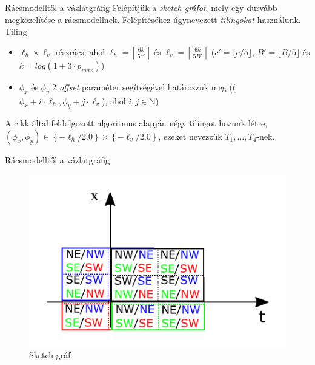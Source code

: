 \documentclass[10pt]{beamer}
\begin{document}
\begin{frame}{Rácsmodelltől a vázlatgráfig}
  Felépítjük a \textit{sketch gráfot}, mely egy durvább megközelítése a rácsmodellnek. Felépítéséhez úgynevezett \textit{tilingokat} használunk.\newline
  Tiling
  \begin{itemize}
  	\item $ \ell_h \times \ell_v $ részrács, ahol $ \ell_h = \left \lceil \frac{6k}{5c'} \right \rceil $ és $ \ell_v = \left \lceil \frac{6k}{5B'} \right \rceil $ ($ c' = \lfloor c/5 \rfloor $, $ B' = \lfloor B/5 \rfloor $ és $ k = log(1 + 3 \cdot p_{max}) $)
  	\item $ \phi_x $ és $ \phi_y $ 2 \textit{offset} paraméter segítségével határozzuk meg (($ \phi_x + i \cdot \ell_h, \phi_y + j \cdot \ell_v $), ahol $ i,j \in \mathbb{N} $)
  \end{itemize}
  A cikk által feldolgozott algoritmus alapján négy tilingot hozunk létre, $ (\phi_x, \phi_y) \in \left\lbrace -\ell_h/2.0 \right\rbrace \times \left\lbrace -\ell_v/2.0 \right\rbrace $, ezeket nevezzük $ T_1, \dots, T_4 $-nek.
\end{frame}

\begin{frame}{Rácsmodelltől a vázlatgráfig}
	\begin{figure}
		\centering \includegraphics[width=0.8\columnwidth]{Image/sketch_graph}
		\caption{\label{fig:sketch_graph}Sketch gráf}
	\end{figure}
\end{frame}
\end{document}
